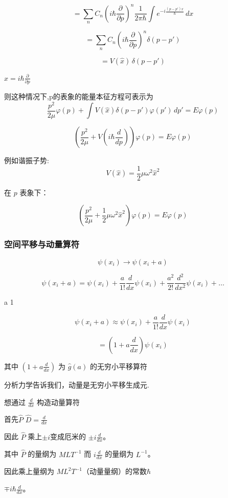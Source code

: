 \documentclass[lang=cn,10pt]{elegantbook}
\begin{document}
\[
	= \sum_n C_n (i \hbar \frac{\partial}{\partial p})^n\frac{1}{2\pi \hbar}\int e^{-i \frac{(p - p')x}{\hbar}} \, dx
\]

\[
= \sum_n C_n(i \hbar \frac{\partial}{\partial p})^n \delta(p - p')
\]

\[
= V(\hat{x}) \, \delta(p - p')
\]

 $\hat{x} = i \hbar \frac{\partial}{\partial p}$

则这种情况下,p的表象的能量本征方程可表示为
\[
	\frac{p^2}{2\mu}\varphi(p) + \int V(\hat{x}) \delta(p - p')  \varphi(p')\, dp' = E \varphi(p)
\]

\[
\left( \frac{p^2}{2\mu} + V(i \hbar \frac{d}{dp}) \right)  \varphi(p) = E  \varphi(p)
\]


例如谐振子势:
\[
V(\hat{x}) =  \frac{1}{2} \mu \omega^2 \hat{x}^2
\]

	在 $p$ 表象下：

\[
\left( \frac{p^2}{2\mu} + \frac{1}{2} \mu \omega^2 \hat{x}^2 \right) \varphi(p) = E \varphi(p)
\]

\subsubsection{空间平移与动量算符}
\[
\psi(x_i) \rightarrow \psi(x_i + a)
\]

\[
	\psi(x_i + a) = \psi(x_i) + \frac{a}{1!} \frac{d}{dx} \psi(x_i) + \frac{a^2}{2!} \frac{d^2}{dx^2} \psi(x_i) + \ldots
\]

 a  1 

\[
\psi(x_i + a) \approx \psi(x_i) + \frac{a}{1!} \frac{d}{dx} \psi(x_i)
\]

\[
= (1 + a \frac{d}{dx}) \psi(x_i)
\]

$\text{其中 } (1 + a \frac{d}{dx}) \text{ 为 } \hat{g}(a) \text{ 的无穷小平移算符}$

分析力学告诉我们，动量是无穷小平移生成元.

想通过 $\frac{d}{dx}$ 构造动量算符

首先$  \hat{P}$ $ \hat{D} = \frac{d}{dx}$ 

因此 $\hat{P}$ 乘上$\pm i$变成厄米的 $\pm i \frac{d}{dx}$。

其中 $\hat{P}$ 的量纲为 $MLT^{-1}$ 而 $i \frac{d}{dx}$ 的量纲为 $L^{-1}$。

因此乘上量纲为 $ML^2T^{-1}$（动量量纲）的常数$\hbar$

	 $\mp i\hbar\frac{d}{dx}$。
\end{document}
